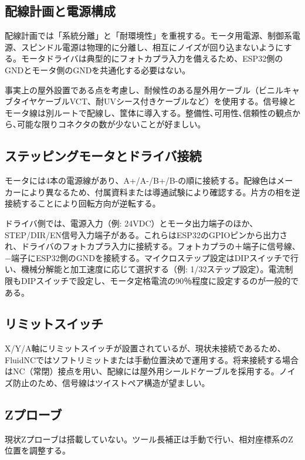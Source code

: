 \documentclass[uplatex,dvipdfmx]{ujarticle}
\begin{document}
\subsection{配線計画と電源構成}

配線計画では「系統分離」と「耐環境性」を重視する。モータ用電源、制御系電源、スピンドル電源は物理的に分離し、相互にノイズが回り込まないようにする。モータドライバは典型的にフォトカプラ入力を備えるため、ESP32側のGNDとモータ側のGNDを共通化する必要はない。

事実上の屋外設置である点を考慮し、耐候性のある屋外用ケーブル（ビニルキャブタイヤケーブルVCT、耐UVシース付きケーブルなど）を使用する。信号線とモータ線は別ルートで配線し、筐体に導入する。整備性､可用性､信頼性の観点から､可能な限りコネクタの数が少ないことが好ましい｡

\subsection{ステッピングモータとドライバ接続}

モータには4本の電源線があり、A+/A-/B+/B-の順に接続する。配線色はメーカーにより異なるため、付属資料または導通試験により確認する。片方の相を逆接続することにより回転方向が逆転する｡

ドライバ側では、電源入力（例: 24VDC）とモータ出力端子のほか、STEP/DIR/EN信号入力端子がある。これらはESP32のGPIOピンから出力され、ドライバのフォトカプラ入力に接続する。フォトカプラの＋端子に信号線、−端子にESP32側のGNDを接続する。マイクロステップ設定はDIPスイッチで行い、機械分解能と加工速度に応じて選択する（例: 1/32ステップ設定）。電流制限もDIPスイッチで設定し、モータ定格電流の90％程度に設定するのが一般的である。

\subsection{リミットスイッチ}

X/Y/A軸にリミットスイッチが設置されているが、現状未接続であるため、FluidNCではソフトリミットまたは手動位置決めで運用する。将来接続する場合はNC（常閉）接点を用い、配線には屋外用シールドケーブルを採用する。ノイズ防止のため、信号線はツイストペア構造が望ましい。

\subsection{Zプローブ}

現状Zプローブは搭載していない。ツール長補正は手動で行い、相対座標系のZ位置を調整する。
\end{document}
